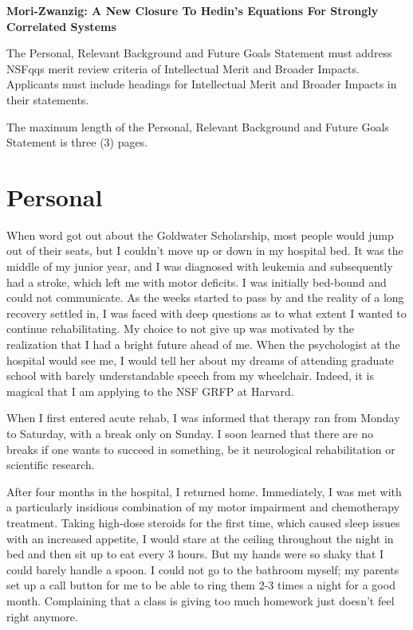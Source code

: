 \documentclass[11pt]{article} %
\begin{document}
\begin{center}
\large{\bf Mori-Zwanzig: A New Closure To Hedin's Equations For Strongly Correlated Systems}
\end{center}

The Personal, Relevant Background and Future Goals Statement must address NSFqqs merit review criteria of Intellectual Merit and Broader Impacts. Applicants must include headings for Intellectual Merit and Broader Impacts in their statements.

The maximum length of the Personal, Relevant Background and Future Goals Statement is three (3) pages.
\section{Personal}
When word got out about the Goldwater Scholarship, most people would jump out of their seats, but I couldn't move up or down in my hospital bed. It was the middle of my junior year, and I was diagnosed with leukemia and subsequently had a stroke, which left me with motor deficits. I was initially bed-bound and could not communicate. As the weeks started to pass by and the reality of a long recovery settled in, I was faced with deep questions as to what extent I wanted to continue rehabilitating. My choice to not give up was motivated by the realization that I had a bright future ahead of me. When the psychologist at the hospital would see me, I would tell her about my dreams of attending graduate school with barely understandable speech from my wheelchair. Indeed, it is magical that I am applying to the NSF GRFP at Harvard.

When I first entered acute rehab, I was informed that therapy ran from Monday to Saturday, with a break only on Sunday. I soon learned that there are no breaks if one wants to succeed in something, be it neurological rehabilitation or scientific research.

After four months in the hospital, I returned home. Immediately, I was met with a particularly insidious combination of my motor impairment and chemotherapy treatment. Taking high-dose steroids for the first time, which caused sleep issues with an increased appetite, I would stare at the ceiling throughout the night in bed and then sit up to eat every 3 hours. But my hands were so shaky that I could barely handle a spoon. I could not go to the bathroom myself; my parents set up a call button for me to be able to ring them 2-3 times a night for a good month. Complaining that a class is giving too much homework just doesn't feel right anymore.
\end{document}
